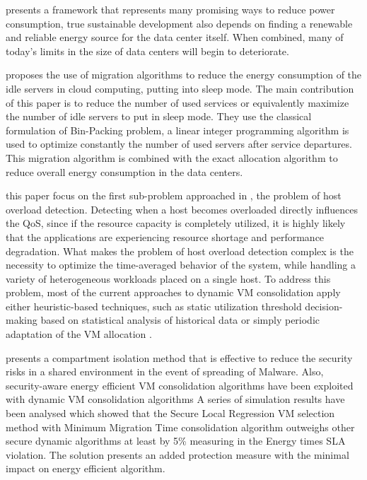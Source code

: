 \documentclass{article}
\begin{document}
\cite{Andrew} presents a framework that represents many promising ways to reduce power consumption, true sustainable development also depends on finding a renewable and reliable energy source for the data center itself. When combined, many of today's limits in the size of data centers will begin to deteriorate. 

\cite{Ghribi} proposes the use of migration algorithms to reduce the energy consumption of the idle servers in cloud computing, putting into sleep mode. The main contribution of this paper is to reduce the number of used services  or equivalently maximize the number of idle servers to put in sleep mode.  They use the classical formulation of Bin-Packing problem,  a linear integer programming algorithm is used to optimize constantly the number of used servers after
service departures. This migration algorithm is combined with the exact allocation algorithm to reduce overall energy consumption in the data centers. 

\cite{Beloglazov} this paper focus on the first sub-problem approached in \cite{beloglazov2012optimal}, the problem  of  host  overload  detection. Detecting  when  a host  becomes  overloaded  directly  influences  the  QoS, since  if  the  resource  capacity  is  completely  utilized,  it is  highly  likely  that  the  applications  are  experiencing resource  shortage  and  performance  degradation.  What makes  the  problem  of  host  overload  detection  complex is the necessity to optimize the time-averaged behavior of the system, while handling a variety of heterogeneous workloads placed on a single host. To address this problem, most of the current approaches to dynamic VM consolidation  apply  either  heuristic-based  techniques,  such as  static  utilization  threshold decision-making based on statistical analysis of historical data or simply periodic adaptation of the VM allocation .

\cite{Farhad} presents a compartment isolation method  that is effective to reduce the security risks in a shared environment in the event of spreading of Malware. Also, security-aware energy efficient VM consolidation algorithms have been exploited with dynamic VM consolidation algorithms A series of simulation results have been analysed which showed that the Secure Local Regression VM selection method with Minimum Migration Time consolidation algorithm outweighs other secure dynamic algorithms at least by 5\% measuring in the Energy times SLA violation. The solution presents an added protection measure with the minimal impact on energy efficient algorithm.
\end{document}
